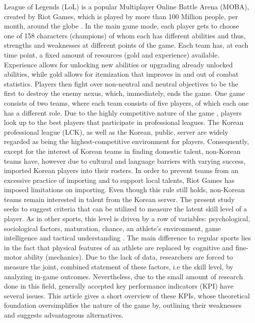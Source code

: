 \documentclass{article}
\begin{document}
League of Legends (LoL) is a popular Multiplayer Online Battle Arena (MOBA), created by Riot Games, which is played by more than 100 Million people, per month, around the globe \citep{kollar2016past}. In the main game mode, each player gets to choose one of 158 characters (champions) of whom each has different abilities and thus, strengths and weaknesses at different points of the game. Each team has, at each time point, a fixed amount of resources (gold and experience) available. Experience allows for unlocking new abilities or upgrading already unlocked abilities, while gold allows for itemization that improves in and out of combat statistics. Players then fight over non-neutral and neutral objectives to be the first to destroy the enemy nexus, which, immediately, ends the game. One game consists of two teams, where each team consists of five players, of which each one has a different role. \newline Due to the highly competitive nature of the game \citep{kou2016ranking}, players look up to the best players that participate in professional leagues. The Korean professional league (LCK), as well as the Korean, public, server are widely regarded as being the highest-competitive environment for players.  Consequently, except for the interest of Korean teams in finding domestic talent, non-Korean teams have, however due to cultural and language barriers with varying success, imported Korean players into their rosters. In order to prevent teams from an excessive practice of importing and to support local talents, Riot Games has imposed limitations on importing. Even though this rule still holds, non-Korean teams remain interested in talent from the Korean server. \newline The present study seeks to suggest criteria that can be utilized to measure the latent skill level of a player. As in other sports, this level is driven by a row of variables: psychological, sociological factors, maturation, chance, an athlete's environment, game intelligence and tactical understanding \citep{williams2020talent}. The main difference to regular sports lies in the fact that physical features of an athlete are replaced by cognitive and fine-motor ability (mechanics). Due to the lack of data, researchers are forced to measure the joint, combined statement of these factors, i.e the skill level, by analyzing in-game outcomes. Nevertheless, due to the small amount of research done in this field, generally accepted key performance indicators (KPI) have several issues. This article gives a short overview of these KPIs, whose theoretical foundation oversimplifies the nature of the game by, outlining their weaknesses and suggests advantageous alternatives.
\end{document}
